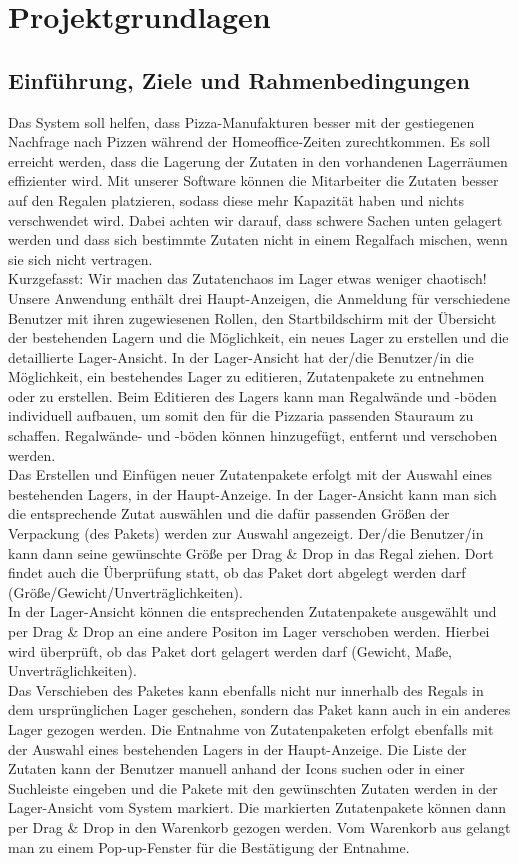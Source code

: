 \section{Projektgrundlagen}

\subsection{Einführung, Ziele und Rahmenbedingungen}
Das System soll helfen, dass Pizza-Manufakturen besser mit der gestiegenen Nachfrage nach Pizzen während der
Homeoffice-Zeiten zurechtkommen. Es soll erreicht werden, dass die Lagerung der Zutaten in den vorhandenen Lagerräumen
effizienter wird. Mit unserer Software können die Mitarbeiter die Zutaten besser auf den Regalen platzieren, sodass
diese mehr Kapazität haben und nichts verschwendet wird. Dabei achten wir darauf, dass schwere Sachen unten
gelagert werden und dass sich bestimmte Zutaten nicht in einem Regalfach mischen, wenn sie sich nicht vertragen.\\
Kurzgefasst: Wir machen das Zutatenchaos im Lager etwas weniger chaotisch!\\
Unsere Anwendung enthält drei Haupt-Anzeigen, die Anmeldung für verschiedene Benutzer mit ihren zugewiesenen Rollen,
den Startbildschirm mit der Übersicht der bestehenden Lagern und die Möglichkeit, ein neues Lager zu erstellen und
die detaillierte Lager-Ansicht. In der Lager-Ansicht hat der/die Benutzer/in die Möglichkeit, ein bestehendes Lager
zu editieren, Zutatenpakete zu entnehmen oder zu erstellen. Beim Editieren des Lagers kann man Regalwände und -böden
individuell aufbauen, um somit den für die Pizzaria passenden Stauraum zu schaffen. Regalwände- und -böden können
hinzugefügt, entfernt und verschoben werden.\\ Das Erstellen und Einfügen neuer Zutatenpakete erfolgt mit der Auswahl
eines bestehenden Lagers, in der Haupt-Anzeige. In der Lager-Ansicht kann man sich die entsprechende Zutat auswählen
und die dafür passenden Größen der Verpackung (des Pakets) werden zur Auswahl angezeigt. Der/die Benutzer/in kann dann
seine gewünschte Größe per Drag \& Drop in das Regal ziehen. Dort findet auch die Überprüfung statt, ob das Paket dort
abgelegt werden darf (Größe/Gewicht/Unverträglichkeiten).\\ In der Lager-Ansicht
können die entsprechenden Zutatenpakete ausgewählt und per Drag \& Drop an eine andere Positon im Lager verschoben
werden. Hierbei wird überprüft, ob das Paket dort gelagert werden darf (Gewicht, Maße, Unverträglichkeiten).\\
Das Verschieben des Paketes kann ebenfalls nicht nur innerhalb des Regals in dem ursprünglichen Lager geschehen,
sondern das Paket kann auch in ein anderes Lager gezogen werden. Die Entnahme von Zutatenpaketen erfolgt ebenfalls mit
der Auswahl eines bestehenden Lagers in der Haupt-Anzeige. Die Liste der Zutaten kann der Benutzer manuell anhand der
Icons suchen oder in einer Suchleiste eingeben und die Pakete mit den gewünschten Zutaten werden in der Lager-Ansicht
vom System markiert. Die markierten Zutatenpakete können dann per Drag \& Drop in den Warenkorb gezogen werden. Vom
Warenkorb aus gelangt man zu einem Pop-up-Fenster für die Bestätigung der Entnahme.

